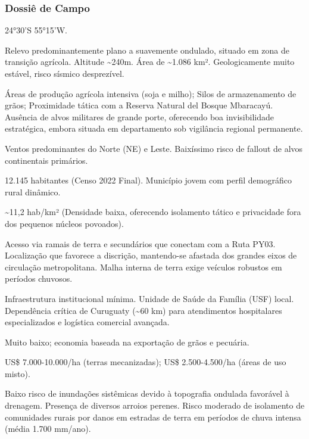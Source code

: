 \subsubsection{Dossiê de Campo}
\begin{description}[style=nextline,leftmargin=0.5cm,font=\bfseries]
\item[Coordenadas]  24°30'S 55°15'W.
\item[Topographical]  Relevo predominantemente plano a suavemente ondulado, situado em zona de transição agrícola. Altitude \textasciitilde 240m. Área de \textasciitilde 1.086 km². Geologicamente muito estável, risco sísmico desprezível.
\item[Alvos Estratégicos]  Áreas de produção agrícola intensiva (soja e milho); Silos de armazenamento de grãos; Proximidade tática com a Reserva Natural del Bosque Mbaracayú. Ausência de alvos militares de grande porte, oferecendo boa invisibilidade estratégica, embora situada em departamento sob vigilância regional permanente.
\item[Fallout]  Ventos predominantes do Norte (NE) e Leste. Baixíssimo risco de fallout de alvos continentais primários.
\item[População]  12.145 habitantes (Censo 2022 Final). Município jovem com perfil demográfico rural dinâmico.
\item[Densidade]  \textasciitilde 11,2 hab/\allowbreak km² (Densidade baixa, oferecendo isolamento tático e privacidade fora dos pequenos núcleos povoados).
\item[Vias de Acesso]  Acesso via ramais de terra e secundários que conectam com a Ruta PY03. Localização que favorece a discrição, mantendo-se afastada dos grandes eixos de circulação metropolitana. Malha interna de terra exige veículos robustos em períodos chuvosos.
\item[Serviços]  Infraestrutura institucional mínima. Unidade de Saúde da Família (USF) local. Dependência crítica de Curuguaty (\textasciitilde 60 km) para atendimentos hospitalares especializados e logística comercial avançada.
\item[Custo de Vida]  Muito baixo; economia baseada na exportação de grãos e pecuária.
\item[Preço da Terra]  US\$ 7.000-10.000/\allowbreak ha (terras mecanizadas); US\$ 2.500-4.500/\allowbreak ha (áreas de uso misto).
\item[Hidrologia]  Baixo risco de inundações sistêmicas devido à topografia ondulada favorável à drenagem. Presença de diversos arroios perenes. Risco moderado de isolamento de comunidades rurais por danos em estradas de terra em períodos de chuva intensa (média 1.700 mm/\allowbreak ano).

\end{description}

